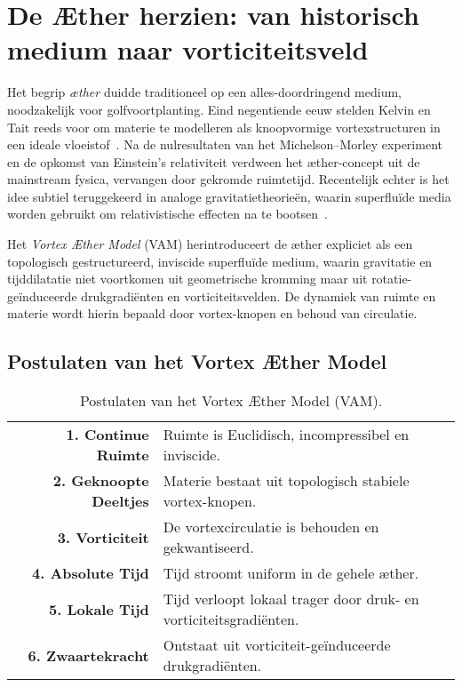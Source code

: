 \section*{De Æther herzien: van historisch medium naar vorticiteitsveld}

Het begrip \textit{æther} duidde traditioneel op een alles-doordringend medium, noodzakelijk voor golfvoortplanting. Eind negentiende eeuw stelden Kelvin en Tait reeds voor om materie te modelleren als knoopvormige vortexstructuren in een ideale vloeistof~\cite{thomson1867treatise}. Na de nulresultaten van het Michelson--Morley experiment en de opkomst van Einstein's relativiteit verdween het æther-concept uit de mainstream fysica, vervangen door gekromde ruimtetijd. Recentelijk echter is het idee subtiel teruggekeerd in analoge gravitatietheorieën, waarin superfluïde media worden gebruikt om relativistische effecten na te bootsen~\cite{barcelo2011analogue,volovik2009universe}.

Het \textit{Vortex Æther Model} (VAM) herintroduceert de æther expliciet als een topologisch gestructureerd, inviscide superfluïde medium, waarin gravitatie en tijddilatatie niet voortkomen uit geometrische kromming maar uit rotatie-geïnduceerde drukgradiënten en vorticiteitsvelden. De dynamiek van ruimte en materie wordt hierin bepaald door vortex-knopen en behoud van circulatie.

\subsection*{Postulaten van het Vortex Æther Model}

\begin{table}[h!]
    \centering
    \begin{tabular}{rl}
        \midrule
        \hline
        \textbf{1. Continue Ruimte} & Ruimte is Euclidisch, incompressibel en inviscide. \\
        \textbf{2. Geknoopte Deeltjes} & Materie bestaat uit topologisch stabiele vortex-knopen. \\
        \textbf{3. Vorticiteit} & De vortexcirculatie is behouden en gekwantiseerd. \\
        \textbf{4. Absolute Tijd} & Tijd stroomt uniform in de gehele æther. \\
        \textbf{5. Lokale Tijd} & Tijd verloopt lokaal trager door druk- en vorticiteitsgradiënten. \\
        \textbf{6. Zwaartekracht} & Ontstaat uit vorticiteit-geïnduceerde drukgradiënten. \\
        \hline
        \bottomrule
    \end{tabular}
    \caption{Postulaten van het Vortex Æther Model (VAM).}
    \label{tab:postulaten}
\end{table}


